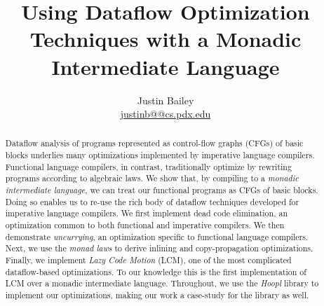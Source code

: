 \documentclass[12pt]{article}
\begin{document}


\newcommand{\authorEmail}{\url{justinb@@cs.pdx.edu}}

\date{}
\author{Justin Bailey \\ \authorEmail}
\title{Using Dataflow Optimization Techniques with a Monadic Intermediate Language}

\maketitle 
{}
           {\thispagestyle{empty}}
           {}

\renewcommand{\abstractnamefont}{\normalfont\small\sffamily\bfseries}
\begin{abstract}
  Dataflow analysis of programs represented as control-flow graphs
  (CFGs) of basic blocks underlies many optimizations implemented by
  imperative language compilers. Functional language compilers, in
  contrast, traditionally optimize by rewriting programs according to
  algebraic laws. We show that, by compiling to a \emph{monadic
    intermediate language}, we can treat our functional programs as
  CFGs of basic blocks. Doing so enables us to re-use the rich body of
  dataflow techniques developed for imperative language compilers. We
  first implement dead code elimination, an optimization common to
  both functional and imperative compilers. We then demonstrate
  \emph{uncurrying}, an optimization specific to functional language
  compilers. Next, we use the \emph{monad laws} to derive inlining and
  copy-propagation optimizations. Finally, we implement \emph{Lazy
    Code Motion} (LCM), one of the most complicated dataflow-based
  optimizations. To our knowledge this is the first implementation of
  LCM over a monadic intermediate language. Throughout, we use the
  \emph{Hoopl} library to implement our optimizations, making our work
  a case-study for the library as well.
\end{abstract}

\end{document}
